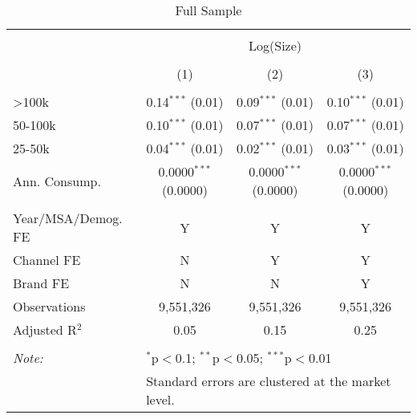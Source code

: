 
\begin{table}[!htbp] \centering 
  \caption{Full Sample} 
  \label{tab:packageSizeFullSoda} 
\begin{tabular}{@{\extracolsep{5pt}}lccc} 
\\[-1.8ex]\hline 
\hline \\[-1.8ex] 
 & \multicolumn{3}{c}{Log(Size)} \\ 
\\[-1.8ex] & (1) & (2) & (3)\\ 
\hline \\[-1.8ex] 
 >100k & 0.14$^{***}$ (0.01) & 0.09$^{***}$ (0.01) & 0.10$^{***}$ (0.01) \\ 
  50-100k & 0.10$^{***}$ (0.01) & 0.07$^{***}$ (0.01) & 0.07$^{***}$ (0.01) \\ 
  25-50k & 0.04$^{***}$ (0.01) & 0.02$^{***}$ (0.01) & 0.03$^{***}$ (0.01) \\ 
  Ann. Consump. & 0.0000$^{***}$ (0.0000) & 0.0000$^{***}$ (0.0000) & 0.0000$^{***}$ (0.0000) \\ 
 \hline \\[-1.8ex] 
Year/MSA/Demog. FE & Y & Y & Y \\ 
Channel FE & N & Y & Y \\ 
Brand FE & N & N & Y \\ 
Observations & 9,551,326 & 9,551,326 & 9,551,326 \\ 
Adjusted R$^{2}$ & 0.05 & 0.15 & 0.25 \\ 
\hline 
\hline \\[-1.8ex] 
\textit{Note:}  & \multicolumn{3}{l}{$^{*}$p$<$0.1; $^{**}$p$<$0.05; $^{***}$p$<$0.01} \\ 
 & \multicolumn{3}{l}{Standard errors are clustered at the market level.} \\ 
\end{tabular} 
\end{table} 
